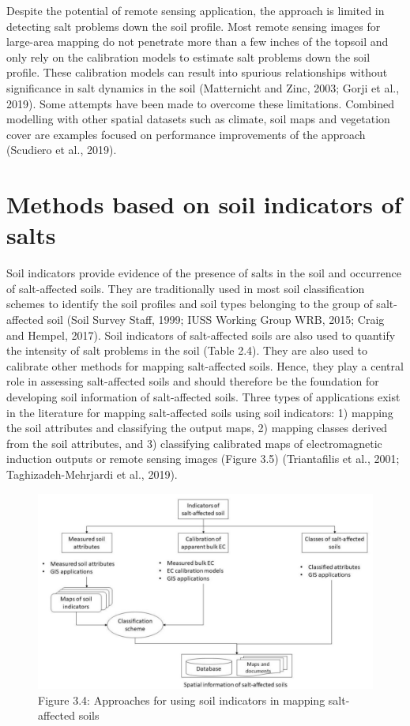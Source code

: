 \documentclass[
  10pt,
  b5paper,
]{book}
\begin{document}
Despite the potential of remote sensing application, the approach is limited in detecting salt problems down the soil profile. Most remote sensing images for large-area mapping do not penetrate more than a few inches of the topsoil and only rely on the calibration models to estimate salt problems down the soil profile. These calibration models can result into spurious relationships without significance in salt dynamics in the soil (Matternicht and Zinc, 2003; Gorji et al., 2019). Some attempts have been made to overcome these limitations. Combined modelling with other spatial datasets such as climate, soil maps and vegetation cover are examples focused on performance improvements of the approach (Scudiero et al., 2019).

\hypertarget{methods-based-on-soil-indicators-of-salts}{%
\section{Methods based on soil indicators of salts}\label{methods-based-on-soil-indicators-of-salts}}

Soil indicators provide evidence of the presence of salts in the soil and occurrence of salt-affected soils. They are traditionally used in most soil classification schemes to identify the soil profiles and soil types belonging to the group of salt-affected soil (Soil Survey Staff, 1999; IUSS Working Group WRB, 2015; Craig and Hempel, 2017). Soil indicators of salt-affected soils are also used to quantify the intensity of salt problems in the soil (Table 2.4). They are also used to calibrate other methods for mapping salt-affected soils. Hence, they play a central role in assessing salt-affected soils and should therefore be the foundation for developing soil information of salt-affected soils.
Three types of applications exist in the literature for mapping salt-affected soils using soil indicators: 1) mapping the soil attributes and classifying the output maps, 2) mapping classes derived from the soil attributes, and 3) classifying calibrated maps of electromagnetic induction outputs or remote sensing images (Figure 3.5) (Triantafilis et al., 2001; Taghizadeh-Mehrjardi et al., 2019).

\begin{figure}
\centering
\includegraphics{figures/images/Figure3.5.jpg}
\caption{Figure 3.4: Approaches for using soil indicators in mapping salt-affected soils}
\end{figure}
\end{document}
